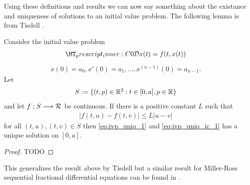 Using these definitions and results we can now say something about the existance and uniqueness of solutions to an initial value problem. The following lemma is from Tisdell \cite{Tisdell2012}.

\begin{mdframed}[innertopmargin=10pt]
\begin{theorem}[Uniqueness]
    \label{thm:unique-tisdell}
    Consider the initial value problem 
    \begin{align}
        \label{eq:ivp_uniq_1}    
        \prescript{C}{0}{\mathcal{D}}x(t) = f(t,x(t))
    \end{align}
    \begin{align}
        \label{eq:ivp_uniq_ic_1}
        x(0) = a_0, x'(0) = a_1, \ldots, x^{(n-1)}(0) = a_{n-1}.
    \end{align}
    Let 
	\begin{align}
	    S:= \{ (t,p) \in \mathbb{R}^2 : t \in [0, a], p \in \mathbb{R} \} 
	\end{align}
	and let $ f : S \longrightarrow \mathcal{R} $ be continuous. If there is a positive constant $ L $ such that 
	\begin{align}
	    |f(t,u) - f(t,v)| \leq L|u-v| 
	\end{align}   
	for all $ (t,u), (t,v) \in S $
	then \eqref{eq:ivp_uniq_1} and \eqref{eq:ivp_uniq_ic_1} has a unique solution on $ [0, a] $.
\end{theorem}
\end{mdframed}
\begin{proof}
    TODO
\end{proof}

This generalizes the result above by Tisdell \cite{Tisdell2012} but a similar result for Miller-Ross sequential
fractional differential equations can be found in \cite{Podlubny1999}.

